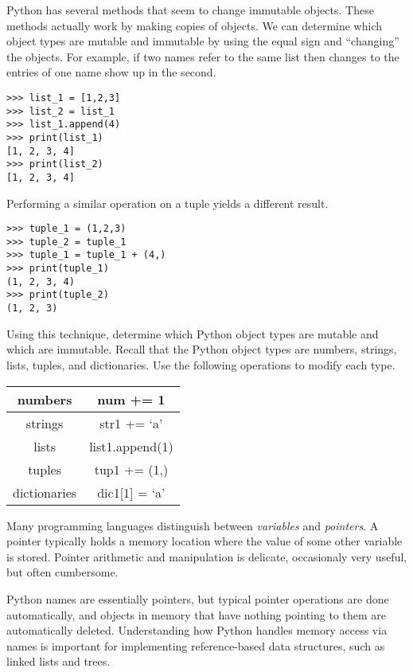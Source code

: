 \begin{problem}
Python has several methods that seem to change immutable objects.
These methods actually work by making copies of objects. We can determine which object types are mutable and immutable by using the equal sign and ``changing'' the objects.
For example, if two names refer to the same list then changes to the entries of one name show up in the second.

\begin{lstlisting}
>>> list_1 = [1,2,3]
>>> list_2 = list_1
>>> list_1.append(4)
>>> print(list_1)
[1, 2, 3, 4]
>>> print(list_2)
[1, 2, 3, 4]
\end{lstlisting}

Performing a similar operation on a tuple yields a different result.
\begin{lstlisting}
>>> tuple_1 = (1,2,3)
>>> tuple_2 = tuple_1
>>> tuple_1 = tuple_1 + (4,)
>>> print(tuple_1)
(1, 2, 3, 4)
>>> print(tuple_2)
(1, 2, 3)
\end{lstlisting}

Using this technique, determine which Python object types are mutable and which are immutable.
Recall that the Python object types are numbers, strings, lists, tuples, and dictionaries.
Use the following operations to modify each type.
\begin{center}
\begin{tabular}{|c|c|}
\hline
numbers & num += 1 \\
\hline
strings & str1 += `a' \\
\hline
lists & list1.append(1) \\
\hline
tuples & tup1 += (1,) \\
\hline
dictionaries & dic1[1] = `a' \\
\hline
\end{tabular}
\end{center}
\end{problem}

\begin{info}
Many programming languages distinguish between \emph{variables} and \emph{pointers}.
A pointer typically holds a memory location where the value of some other variable is stored.
Pointer arithmetic and manipulation is delicate, occasionaly very useful, but often cumbersome.

Python names are essentially pointers, but typical pointer operations are done automatically, and objects in memory that have nothing pointing to them are automatically deleted.
Understanding how Python handles memory access via names is important for implementing reference-based data structures, such as linked lists and trees.
\end{info}


